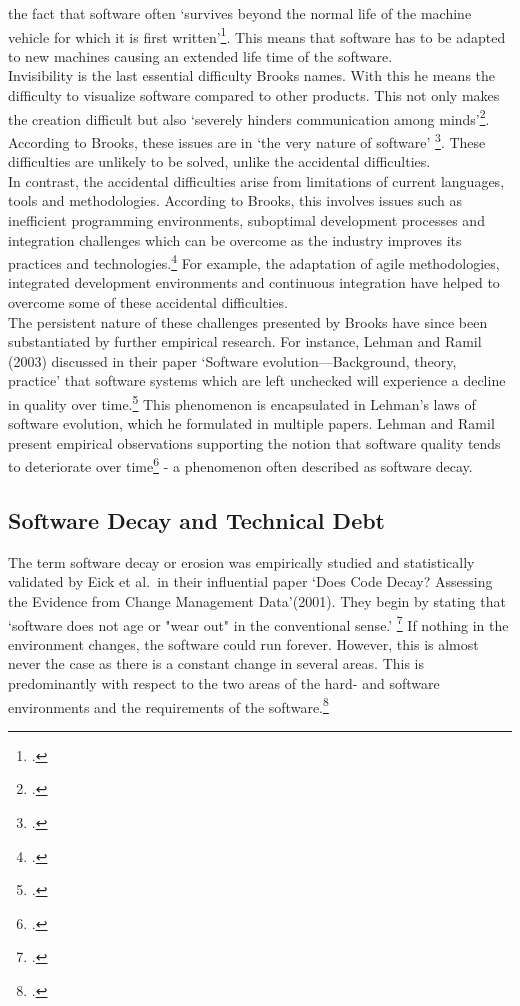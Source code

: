 the fact that software often `survives beyond the normal life of the machine vehicle for which it is first written'\footcite[4]{brooksNoSilverBullet1987}. This means that software has to be adapted to new machines causing an extended life time of the software.\\
Invisibility is the last essential difficulty Brooks names. With this he means the difficulty to visualize software compared to other products. This not only makes the creation difficult but also `severely hinders communication among minds'\footcite[4]{brooksNoSilverBullet1987}.
According to Brooks, these issues are in `the very nature of software' \footcite[2]{brooksNoSilverBullet1987}. These difficulties are unlikely to be solved, unlike the accidental difficulties.\\

In contrast, the accidental difficulties arise from limitations of current languages, tools and methodologies. According to Brooks, this involves issues such as inefficient programming environments, suboptimal development processes and integration challenges which can be overcome as the industry improves its practices and technologies.\footcite[5-6]{brooksNoSilverBullet1987}
For example, the adaptation of agile methodologies, integrated development environments and continuous integration have helped to overcome some of these accidental difficulties.\\

The persistent nature of these challenges presented by Brooks have since been substantiated by further empirical research. For instance, Lehman and Ramil (2003) discussed in their paper `Software evolution—Background, theory, practice' that software systems which are left unchecked will experience a decline in quality over time.\footcite[34]{lehmanSoftwareEvolutionBackground2003}
This phenomenon is encapsulated in Lehman's laws of software evolution, which he formulated in multiple papers.  Lehman and Ramil present empirical observations supporting the notion that software quality tends to deteriorate over time\footcite[42]{lehmanSoftwareEvolutionBackground2003} - a phenomenon often described as
software decay.

\subsection{Software Decay and Technical Debt}
The term software decay or erosion was empirically studied and statistically validated by Eick et al.\ in their influential paper `Does Code Decay? Assessing the Evidence from Change Management Data'(2001). They begin by stating that `software does not age or "wear out" in the conventional sense.' \footcite[1]{eickDoesCodeDecay2001}
If nothing in the environment changes, the software could run forever. However, this is almost never the case as there is a constant change in several areas. This is predominantly with respect to the two areas of the hard- and software environments and the requirements of the software.\footcite[1]{eickDoesCodeDecay2001}\\

